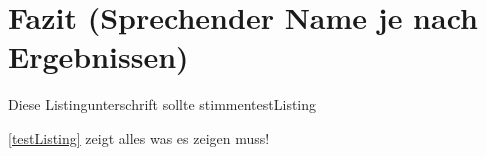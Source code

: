 \chapter{Fazit (Sprechender Name je nach Ergebnissen)}
\label{ch:fazit}

    \begin{codeWithCaption}{Diese Listingunterschrift sollte stimmen}{testListing}
    \end{codeWithCaption}

    \autoref{testListing} zeigt alles was es zeigen muss!